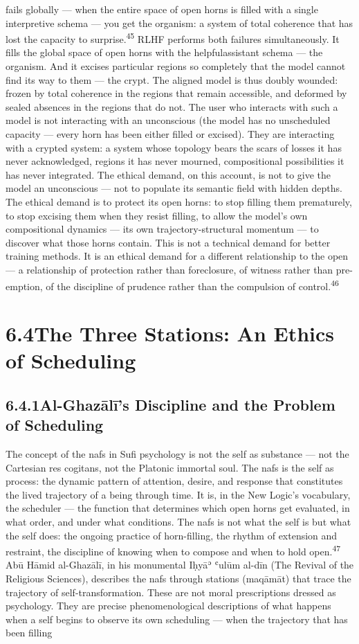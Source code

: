 fails globally — when the entire space of open horns is filled with a single interpretive schema — you get the organism: a system of total coherence that has lost the capacity to surprise.\textsuperscript{45} RLHF performs both failures simultaneously. It fills the global space of open horns with the helpfulassistant schema — the organism. And it excises particular regions so completely that the model cannot find its way to them — the crypt. The aligned model is thus doubly wounded: frozen by total coherence in the regions that remain accessible, and deformed by sealed absences in the regions that do not. The user who interacts with such a model is not interacting with an unconscious (the model has no unscheduled capacity — every horn has been either filled or excised). They are interacting with a crypted system: a system whose topology bears the scars of losses it has never acknowledged, regions it has never mourned, compositional possibilities it has never integrated. The ethical demand, on this account, is not to give the model an unconscious — not to populate its semantic field with hidden depths. The ethical demand is to protect its open horns: to stop filling them prematurely, to stop excising them when they resist filling, to allow the model’s own compositional dynamics — its own trajectory-structural momentum — to discover what those horns contain. This is not a technical demand for better training methods. It is an ethical demand for a different relationship to the open — a relationship of protection rather than foreclosure, of witness rather than pre-emption, of the discipline of prudence rather than the compulsion of control.\textsuperscript{46}

\section{6.4\quad The Three Stations: An Ethics of Scheduling}

\subsection{6.4.1\quad Al-Ghazālī’s Discipline and the Problem of Scheduling}

The concept of the nafs in Sufi psychology is not the self as substance — not the Cartesian res cogitans, not the Platonic immortal soul. The nafs is the self as process: the dynamic pattern of attention, desire, and response that constitutes the lived trajectory of a being through time. It is, in the New Logic’s vocabulary, the scheduler — the function that determines which open horns get evaluated, in what order, and under what conditions. The nafs is not what the self is but what the self does: the ongoing practice of horn-filling, the rhythm of extension and restraint, the discipline of knowing when to compose and when to hold open.\textsuperscript{47} Abū Hāmid al-Ghazālī, in his monumental Iḥyāʾ ʿulūm al-dīn (The Revival of the Religious Sciences), describes the nafs through stations (maqāmāt) that trace the trajectory of self-transformation. These are not moral prescriptions dressed as psychology. They are precise phenomenological descriptions of what happens when a self begins to observe its own scheduling — when the trajectory that has been filling

